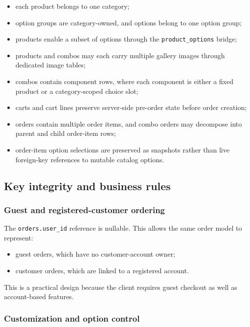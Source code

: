 \begin{itemize}
    \item each product belongs to one category;
    \item option groups are category-owned, and options belong to one option group;
    \item products enable a subset of options through the \texttt{product\_options} bridge;
    \item products and combos may each carry multiple gallery images through dedicated image tables;
    \item combos contain component rows, where each component is either a fixed product or a category-scoped choice slot;
    \item carts and cart lines preserve server-side pre-order state before order creation;
    \item orders contain multiple order items, and combo orders may decompose into parent and child order-item rows;
    \item order-item option selections are preserved as snapshots rather than live foreign-key references to mutable catalog options.
\end{itemize}

\subsection{Key integrity and business rules}

\subsubsection{Guest and registered-customer ordering}

The \texttt{orders.user\_id} reference is nullable. This allows the same order model to represent:

\begin{itemize}
    \item guest orders, which have no customer-account owner;
    \item customer orders, which are linked to a registered account.
\end{itemize}

This is a practical design because the client requires guest checkout as well as account-based features.

\subsubsection{Customization and option control}

